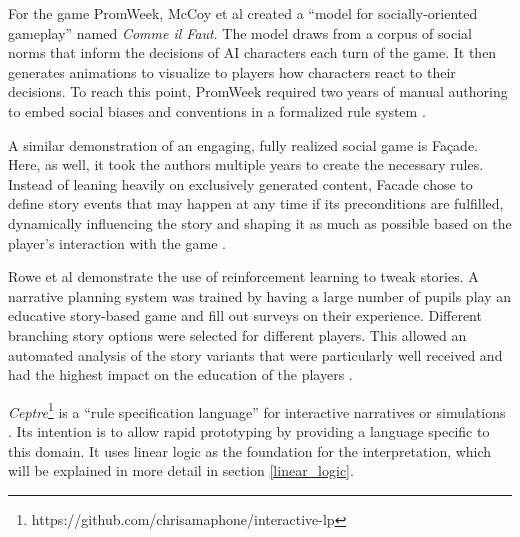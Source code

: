 For the game PromWeek, McCoy et al created a \enquote{model for socially-oriented gameplay} named \emph{Comme il Faut}.
The model draws from a corpus of social norms that inform the decisions of AI characters each turn of the game.
It then generates animations to visualize to players how characters react to their decisions.
To reach this point, PromWeek required two years of manual authoring to embed social biases and conventions in a formalized rule system \cite{mccoy_2013, McCoy:2011:CIF:3014589.3014617}.

A similar demonstration of an engaging, fully realized social game is Fa\c{c}ade.
Here, as well, it took the authors multiple years to create the necessary rules.
Instead of leaning heavily on exclusively generated content, Facade chose to define story events that may happen at any time if its preconditions are fulfilled, dynamically influencing the story and shaping it as much as possible based on the player's interaction with the game \cite{Mateas_2003}.

Rowe et al demonstrate the use of reinforcement learning to tweak stories.
A narrative planning system was trained by having a large number of pupils play an educative story-based game and fill out surveys on their experience.
Different branching story options were selected for different players.
This allowed an automated analysis of the story variants that were particularly well received and had the highest impact on the education of the players \cite{rowe_2014}.

\emph{Ceptre}\footnote{https://github.com/chrisamaphone/interactive-lp} is a \enquote{rule specification language} for interactive narratives or simulations \cite{martens_2015}.
Its intention is to allow rapid prototyping by providing a language specific to this domain.
It uses linear logic as the foundation for the interpretation, which will be explained in more detail in section \ref{linear_logic}.
